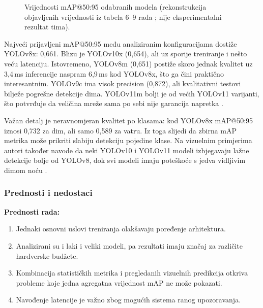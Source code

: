 \begin{figure}[H]
\centering
{}
\caption{Vrijednosti mAP@50:95 odabranih modela (rekonstrukcija objavljenih vrijednosti iz tabela 6--9 rada \cite{ramos}; nije eksperimentalni rezultat tima).}
\label{fig:dino-map}
\end{figure}

Najveći prijavljeni mAP@50:95 među analiziranim konfiguracijama dostiže YOLOv8x: 0,661. Blizu je YOLOv10x (0,654), ali uz sporije treniranje i nešto veću latenciju. Istovremeno, YOLOv8m (0,651) postiže skoro jednak kvalitet uz 3,4\,ms inferencije naspram 6,9\,ms kod YOLOv8x, što ga čini praktično interesantnim. YOLOv9c ima visok precision (0,872), ali kvalitativni testovi bilježe pogrešne detekcije dima. YOLOv11m bolji je od većih YOLOv11 varijanti, što potvrđuje da veličina mreže sama po sebi nije garancija napretka \cite{ramos}.

Važan detalj je neravnomjeran kvalitet po klasama: kod YOLOv8x mAP@50:95 iznosi 0,732 za dim, ali samo 0,589 za vatru. Iz toga slijedi da zbirna mAP metrika može prikriti slabiju detekciju pojedine klase. Na vizuelnim primjerima autori također navode da neki YOLOv10 i YOLOv11 modeli izbjegavaju lažne detekcije bolje od YOLOv8, dok svi modeli imaju poteškoće s jedva vidljivim dimom noću \cite{ramos}.

\subsubsection{Prednosti i nedostaci}
\textbf{Prednosti rada:}
\begin{enumerate}
  \item Jednaki osnovni uslovi treniranja olakšavaju poređenje arhitektura.
  \item Analizirani su i laki i veliki modeli, pa rezultati imaju značaj za različite hardverske budžete.
  \item Kombinacija statističkih metrika i pregledanih vizuelnih predikcija otkriva probleme koje jedna agregatna vrijednost mAP ne može pokazati.
  \item Navođenje latencije je važno zbog mogućih sistema ranog upozoravanja.
\end{enumerate}

